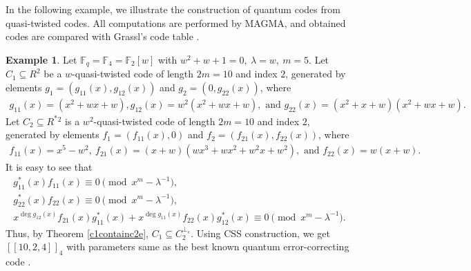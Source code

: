 \documentclass[12 pt]{extarticle}
\numberwithin{equation}{section}
\theoremstyle{definition}
\newtheorem{example}{Example}[section]
\begin{document}
In the following example, we illustrate the construction of quantum codes from quasi-twisted codes. All computations are performed by MAGMA\cite{magma}, and obtained codes are compared with Grassl's code table \cite{codetable}. 
\begin{example}
  Let $\mathbb{F}_q=\mathbb{F}_4=\mathbb{F}_2[w]$ with $w^2+w+1=0,\ \lambda=w,\  m=5$.
Let $C_1\subseteq R^2$ be a $w$-quasi-twisted code of length $2m=10$ and index $2$, generated by elements $g_1=(g_{11}(x),g_{12}(x))$ and $g_2=(0,g_{22}(x))$, where 
\begin{align*}
    g_{11}(x)=(x^2+wx+w), g_{12}(x)=w^2(x^2+wx+w), \text{ and } g_{22}(x)=(x^2+x+w)(x^2+wx+w).
\end{align*}
 Let $C_2\subseteq R^*{^2}$ is a $w^2$-quasi-twisted code of length $2m=10$ and index $2$, generated by elements $f_1=(f_{11}(x),0)$ and $f_2=(f_{21}(x),f_{22}(x))$, where
 \begin{align*}
  f_{11}(x)=x^5-w^2,\  f_{21}(x)=(x+w)(wx^3+wx^2+w^2x+w^2), \text{ and } f_{22}(x)=w(x+w).   
 \end{align*}
It is easy to see that
\begin{align*}
    g^*_{11}(x)f_{11}(x)\equiv 0\pmod{x^m-\lambda^{-1}},\\
 g_{22}^*(x)f_{22}(x)\equiv 0\pmod{x^m-\lambda^{-1}},\\
 x^{\deg g_{12}(x)}f_{21}(x) g^*_{11}(x)     +x^{\deg g_{11}(x)}f_{22}(x) g^*_{12}(x)\equiv 0\pmod{x^m-\lambda^{-1}}.
\end{align*}
Thus, by Theorem \ref{c1containc2e}, $C_1\subseteq C_2^{\perp_e}$. Using CSS construction, we get $[[10,2,4]]_4$ with parameters same as the best known quantum error-correcting code \cite{codetable}.
\end{example}

\end{document}
